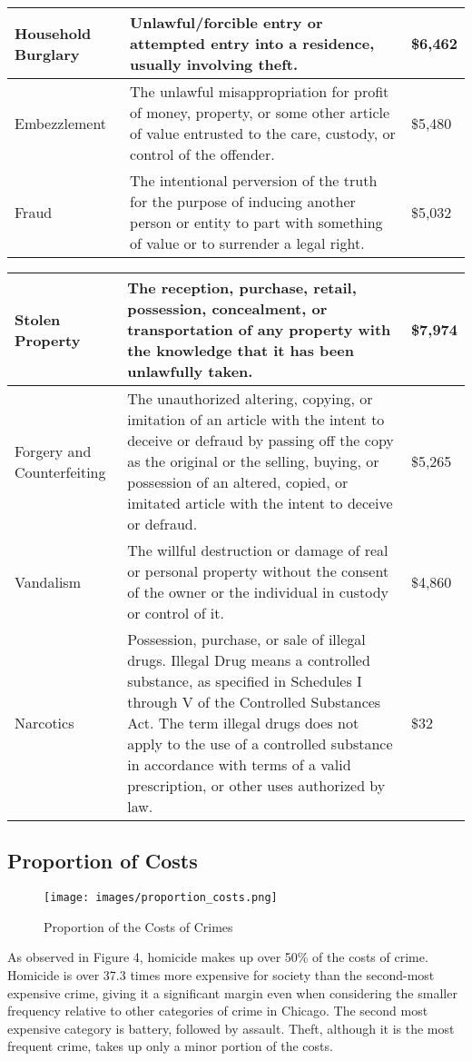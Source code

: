 \documentclass{article}
\begin{document}
\begin{onehalfspacing}
\begin{center}
\begin{tabular}{ | m{1in} | m{4in}| m{1in} | }
  Household Burglary & Unlawful/forcible entry or attempted entry into a residence, usually involving theft. & \$6,462 \\
  \hline
  Embezzlement & The unlawful misappropriation for profit of money, property, or some other article of value entrusted to the care, custody, or control of the offender. & \$5,480 \\
  \hline
  Fraud & The intentional perversion of the truth for the purpose of inducing another person or entity to part with something of value or to surrender a legal right. & \$5,032 \\
  \hline
\end{tabular}
\end{center}
\begin{center}
\begin{tabular}{ | m{1in} | m{4in}| m{1in} | } 
  \hline
  Stolen Property & The reception, purchase, retail, possession, concealment, or transportation of any property with the knowledge that it has been unlawfully taken. & \$7,974 \\
  \hline
  Forgery and Counterfeiting & The unauthorized altering, copying, or imitation of an article with the intent to deceive or defraud by passing off the copy as the original or the selling, buying, or possession of an altered, copied, or imitated article with the intent to deceive or defraud. & \$5,265 \\
  \hline
  Vandalism & The willful destruction or damage of real or personal property without the consent of the owner or the individual in custody or control of it. & \$4,860 \\
  \hline
  Narcotics & Possession, purchase, or sale of illegal drugs. Illegal Drug means a controlled substance, as specified in Schedules I through V of the Controlled Substances Act. The term illegal drugs does not apply to the use of a controlled substance in accordance with terms of a valid prescription, or other uses authorized by law. & \$32 \\
  \hline
\end{tabular}
\end{center}

\subsection{Proportion of Costs}
\begin{figure}[H]
    \centering
    \centerline{\texttt{[image: images/proportion\_costs.png]}}
    \caption{Proportion of the Costs of Crimes}
\end{figure}
As observed in Figure 4, homicide makes up over 50\% of the costs of crime. Homicide is over 37.3 times more expensive for society than the second-most expensive crime, giving it a significant margin even when considering the smaller frequency relative to other categories of crime in Chicago. The second most expensive category is battery, followed by assault. Theft, although it is the most frequent crime, takes up only a minor portion of the costs.


\end{onehalfspacing}
\end{document}
